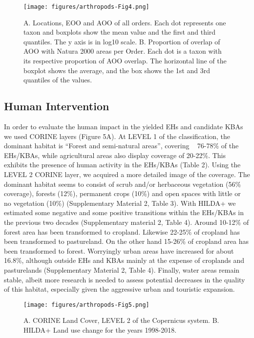    \begin{figure}[h]
      \centering
      \texttt{[image: figures/arthropods-Fig4.png]}
      \caption[AOO, EOO and N2K overlaps per order]{A. Locations, EOO and AOO of all orders. Each dot represents one taxon and boxplots show the mean value and the first and third quantiles. The y axis is in log10 scale. B. Proportion of overlap of AOO with Natura 2000 areas per Order. Each dot is a taxon with its respective proportion of AOO overlap. The horizontal line of the boxplot shows the average, and the box shows the 1st and 3rd quantiles of the values.}
      \label{fig:arthropods-fig4}
   \end{figure}

    \subsection{Human Intervention}
    \label{subsec:arthropods-human-intervention}


In order to evaluate the human impact in the yielded EHs and candidate KBAs we
used CORINE layers (Figure 5A). At LEVEL 1 of the classification, the dominant
habitat is “Forest and semi-natural areas”, covering ~ 76-78\% of the EHs/KBAs,
while agricultural areas also display coverage of 20-22\%. This exhibits the
presence of human activity in the EHs/KBAs (Table 2). Using the LEVEL 2 CORINE
layer, we acquired a more detailed image of the coverage. The dominant habitat
seems to consist of scrub and/or herbaceous vegetation  (56\% coverage),
forests (12\%), permanent crops (10\%) and open spaces with little or
no vegetation (10\%) (Supplementary Material 2, Table 3). With HILDA+ we
estimated some negative and some positive transitions within the EHs/KBAs in
the previous two decades (Supplementary material 2, Table 4). Around 10-12\% of
forest area has been transformed to cropland. Likewise 22-25\% of cropland has
been transformed to pastureland. On the other hand 15-26\% of cropland area has
been transformed to forest. Worryingly urban areas have increased for about 16.8\%,
although outside EHs and KBAs mainly at the expense of croplands and
pasturelands (Supplementary Material 2, Table 4). Finally, water areas remain
stable, albeit more research is needed to assess potential decreases in the
quality of this habitat, especially given the aggressive urban and touristic expansion.


   \begin{figure}[h]
      \centering
      \texttt{[image: figures/arthropods-Fig5.png]}
      \caption[Land Use of Crete and the changes]{A. CORINE Land Cover, LEVEL 2 of the Copernicus system. B. HILDA+ Land use change for the years 1998-2018.}
      \label{fig:arthropods-fig5}
   \end{figure}


